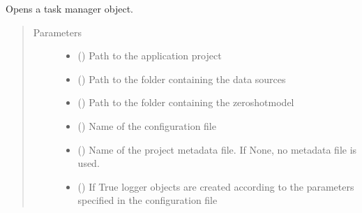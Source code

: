 \documentclass[letterpaper,10pt,english]{sphinxmanual}
\begin{document}
\begin{fulllineitems}
\begin{fulllineitems}
\label{\detokenize{dc_task_manager:src.task_manager.TaskManagerCMD.__init__}}
\sphinxAtStartPar
Opens a task manager object.
\begin{quote}\begin{description}
\item[{Parameters}] \leavevmode\begin{itemize}
\item {} 
\sphinxAtStartPar
{} () \textendash{} Path to the application project

\item {} 
\sphinxAtStartPar
{} () \textendash{} Path to the folder containing the data sources

\item {} 
\sphinxAtStartPar
{} () \textendash{} Path to the folder containing the zero\sphinxhyphen{}shot\sphinxhyphen{}model

\item {} 
\sphinxAtStartPar
{} () \textendash{} Name of the configuration file

\item {} 
\sphinxAtStartPar
{} () \textendash{} Name of the project metadata file.
If None, no metadata file is used.

\item {} 
\sphinxAtStartPar
{} () \textendash{} If True logger objects are created according to the parameters
specified in the configuration file


\end{itemize}
\end{description}
\end{quote}
\end{fulllineitems}
\end{fulllineitems}
\end{document}
